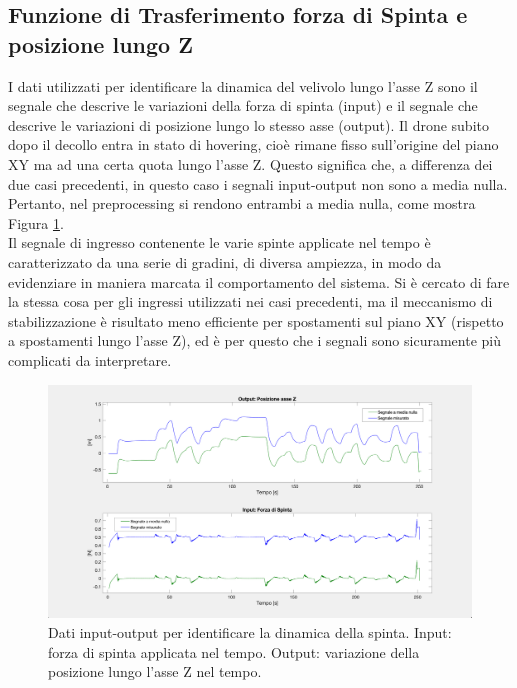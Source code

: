 \subsection{Funzione di Trasferimento forza di Spinta e posizione lungo Z}
I dati utilizzati per identificare la dinamica del velivolo lungo l'asse Z sono il segnale che descrive le variazioni della forza di spinta (input) e il segnale che descrive le variazioni di posizione lungo lo stesso asse (output). Il drone subito dopo il decollo entra in stato di hovering, cioè rimane fisso sull'origine del piano XY ma ad una certa quota lungo l'asse Z. Questo significa che, a differenza dei due casi precedenti, in questo caso i segnali input-output non sono a media nulla. Pertanto, nel preprocessing si rendono entrambi a media nulla, come mostra Figura \ref{fig:tz_input}.\\

Il segnale di ingresso contenente le varie spinte applicate nel tempo è caratterizzato da una serie di gradini, di diversa ampiezza, in modo da evidenziare in maniera marcata il comportamento del sistema. Si è cercato di fare la stessa cosa per gli ingressi utilizzati nei casi precedenti, ma il meccanismo di stabilizzazione è risultato meno efficiente per spostamenti sul piano XY (rispetto a spostamenti lungo l'asse Z), ed è per questo che i segnali sono sicuramente più complicati da interpretare.

\begin{figure}[H]
	\centering
	\includegraphics[width=1\textwidth]{gfx/SysId/tz_input}
	\caption[Dati input-output per identificare la dinamica della spinta.]{Dati input-output per identificare la dinamica della spinta. Input: forza di spinta applicata nel tempo. Output: variazione della posizione lungo l'asse Z nel tempo.}
	\label{fig:tz_input}
\end{figure}

